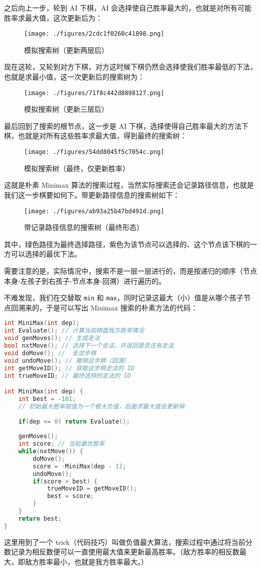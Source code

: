 之后向上一步，轮到 AI 下棋，AI 会选择使自己胜率最大的，也就是对所有可能胜率求最大值，这次更新后为：
\begin{figure}[ht]
\centering
\texttt{[image: ./figures/2cdc1f0260c41898.png]}
\caption{模拟搜索树（更新两层后）} \label{fig_mmsab_4}
\end{figure}

现在这轮，又轮到对方下棋，对方这时候下棋仍然会选择使我们胜率最低的下法，也就是求最小值，这一次更新后的搜索树为：
\begin{figure}[ht]
\centering
\texttt{[image: ./figures/71f8c442d8898127.png]}
\caption{模拟搜索树（更新三层后）} \label{fig_mmsab_5}
\end{figure}

最后回到了搜索的根节点，这一步是 AI 下棋，选择使得自己胜率最大的方法下棋，也就是对所有这些胜率求最大值，得到最终的搜索树：
\begin{figure}[ht]
\centering
\texttt{[image: ./figures/54dd8045f5c7054c.png]}
\caption{模拟搜索树（最终，仅更新胜率）} \label{fig_mmsab_6}
\end{figure}

这就是朴素 Minimax 算法的搜索过程，当然实际搜索还会记录路径信息，也就是我们这一步棋要如何下。带更新路径信息的搜索树如下：
\begin{figure}[ht]
\centering
\texttt{[image: ./figures/ab93a25b47bd491d.png]}
\caption{带记录路径信息的搜索树（最终形态）} \label{fig_mmsab_8}
\end{figure}
其中，绿色路径为最终选择路径，紫色为该节点可以选择的、这个节点该下棋的一方可以选择的最优下法。

需要注意的是，实际情况中，搜索不是一层一层进行的，而是按递归的顺序（节点本身-左孩子到右孩子-节点本身-回溯）进行遍历的。

不难发现，我们在交替取 \verb`min` 和 \verb`max`，同时记录这最大（小）值是从哪个孩子节点回溯来的，于是可以写出 Minimax 搜索的朴素方法的代码：
\begin{lstlisting}[language=cpp]
int MiniMax(int dep); 
int Evaluate(); // 计算当前棋盘我方胜率情况 
void genMoves(); // 生成走法 
bool nxtMove(); // 选择下一个走法，并返回是否还有走法 
void doMove(); //  走这步棋 
void undoMove(); // 撤销这步棋（回溯）
int getMoveID(); // 获取这步棋走法的 ID 
int trueMoveID; // 最终选择的走法的 ID 

int MiniMax(int dep) {
	int best = -101;
	// 初始最大胜率赋值为一个极大负值，后面求最大值会更新掉 
	
	if(dep <= 0) return Evaluate(); 
	
	genMoves();
	int score; // 当前最优胜率 
	while(nxtMove()) {
		doMove();
		score = -MiniMax(dep - 1);		
		undoMove();
		if(score > best) {
			trueMoveID = getMoveID();
			best = score;
		}
	}
	return best;
}
\end{lstlisting}
这里用到了一个 trick（代码技巧）叫做负值最大算法，搜索过程中通过将当前分数记录为相反数便可以一直使用最大值来更新最高胜率。（敌方胜率的相反数最大，即敌方胜率最小，也就是我方胜率最大。）


